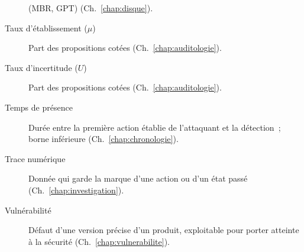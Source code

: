 \begin{description}
          (MBR, GPT) (Ch.~\ref{chap:disque}).
    \item[Taux d'établissement ($\mu$)] Part des propositions cotées \OUI{}
          (Ch.~\ref{chap:auditologie}).
    \item[Taux d'incertitude ($U$)] Part des propositions cotées \NEK{}
          (Ch.~\ref{chap:auditologie}).
    \item[Temps de présence] Durée entre la première action établie de
          l'attaquant et la détection~; borne inférieure
          (Ch.~\ref{chap:chronologie}).
    \item[Trace numérique] Donnée qui garde la marque d'une action ou d'un
          état passé (Ch.~\ref{chap:investigation}).
    \item[Vulnérabilité] Défaut d'une version précise d'un produit, exploitable
          pour porter atteinte à la sécurité (Ch.~\ref{chap:vulnerabilite}).
\end{description}
